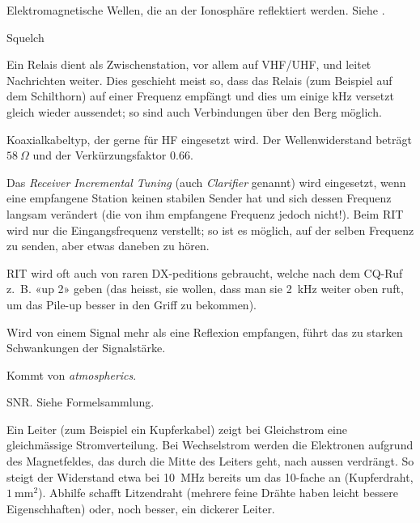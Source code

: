 {Elektromagnetische Wellen, die an der Ionosphäre reflektiert werden. Siehe .}

{Squelch}

{Ein Relais dient als Zwischenstation, vor allem auf VHF/UHF, und leitet Nachrichten weiter. Dies geschieht meist so, dass das Relais (zum Beispiel auf dem Schilthorn) auf einer Frequenz empfängt und dies um einige kHz versetzt gleich wieder aussendet; so sind auch Verbindungen über den Berg möglich.}

{Koaxialkabeltyp, der gerne für HF eingesetzt wird. Der Wellenwiderstand beträgt $58~\Omega$ und der Verkürzungsfaktor 0.66.}

{Das \textit{Receiver Incremental Tuning} (auch \textit{Clarifier} genannt) wird eingesetzt, wenn eine empfangene Station keinen stabilen Sender hat und sich dessen Frequenz langsam verändert (die von ihm empfangene Frequenz jedoch nicht!). Beim RIT wird nur die Eingangsfrequenz verstellt; so ist es möglich, auf der selben Frequenz zu senden, aber etwas daneben zu hören.

RIT wird oft auch von raren DX-peditions gebraucht, welche nach dem CQ-Ruf z. B. «up 2» geben (das heisst, sie wollen, dass man sie 2 kHz weiter oben ruft, um das Pile-up besser in
den Griff zu bekommen).}

{Wird von einem Signal mehr als eine Reflexion empfangen, führt das zu starken Schwankungen der Signalstärke.}

{Kommt von \textit{atmospherics}. }

{SNR. Siehe Formelsammlung.}

{Ein Leiter (zum Beispiel ein Kupferkabel) zeigt bei Gleichstrom eine gleichmässige Stromverteilung. Bei Wechselstrom werden die Elektronen aufgrund des Magnetfeldes, das durch die Mitte des Leiters geht, nach aussen verdrängt. So steigt der Widerstand etwa bei 10 MHz bereits um das 10-fache an (Kupferdraht, $1~\mathrm{mm}^2$). Abhilfe schafft Litzendraht (mehrere feine Drähte haben leicht bessere Eigenschhaften) oder, noch besser, ein dickerer Leiter.}

{}

